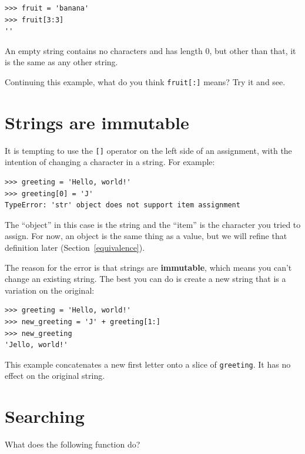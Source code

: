 \documentclass[10pt]{book}
\begin{document}
\begin{verbatim}
>>> fruit = 'banana'
>>> fruit[3:3]
''
\end{verbatim}
%
An empty string contains no characters and has length 0, but other
than that, it is the same as any other string.

Continuing this example, what do you think
{\tt fruit[:]} means?  Try it and see.



\section{Strings are immutable}

It is tempting to use the {\tt []} operator on the left side of an
assignment, with the intention of changing a character in a string.
For example:

\begin{verbatim}
>>> greeting = 'Hello, world!'
>>> greeting[0] = 'J'
TypeError: 'str' object does not support item assignment
\end{verbatim}
%
The ``object'' in this case is the string and the ``item'' is
the character you tried to assign.  For now, an object is
the same thing as a value, but we will refine that definition
later (Section~\ref{equivalence}).

The reason for the error is that
strings are {\bf immutable}, which means you can't change an
existing string.  The best you can do is create a new string
that is a variation on the original:

\begin{verbatim}
>>> greeting = 'Hello, world!'
>>> new_greeting = 'J' + greeting[1:]
>>> new_greeting
'Jello, world!'
\end{verbatim}
%
This example concatenates a new first letter onto
a slice of {\tt greeting}.  It has no effect on
the original string.


\section{Searching}
\label{find}

What does the following function do?
\end{document}
